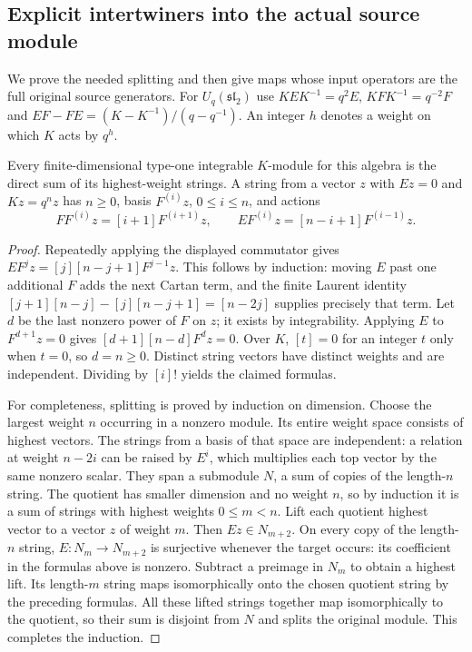 \subsection{Explicit intertwiners into the actual source module}

We prove the needed splitting and then give maps whose input
operators are the full original source generators. For
$U_q(\mathfrak{sl}_2)$ use
$KEK^{-1}=q^2E$, $KFK^{-1}=q^{-2}F$ and
$EF-FE=(K-K^{-1})/(q-q^{-1})$.
An integer $h$ denotes a weight on which $K$ acts by $q^h$.

\begin{lemma}\label{lem:gct-explicit-string-splitting}
Every finite-dimensional type-one integrable $K$-module for this
algebra is the direct sum of its highest-weight strings. A string
from a vector $z$ with $Ez=0$ and $Kz=q^n z$ has $n\geq0$,
basis $F^{(i)}z$, $0\leq i\leq n$, and actions
\[
 F F^{(i)}z=[i+1]F^{(i+1)}z,\qquad
 E F^{(i)}z=[n-i+1]F^{(i-1)}z.
\]
\end{lemma}
\begin{proof}
Repeatedly applying the displayed commutator gives
$EF^jz=[j][n-j+1]F^{j-1}z$. This follows by induction:
moving $E$ past one additional $F$ adds the next Cartan term,
and the finite Laurent identity
$[j+1][n-j]-[j][n-j+1]=[n-2j]$ supplies precisely that term.
Let $d$ be the last nonzero power of $F$ on $z$; it exists by
integrability. Applying $E$ to $F^{d+1}z=0$ gives
$[d+1][n-d]F^dz=0$. Over $K$, $[t]=0$ for an integer $t$
only when $t=0$, so $d=n\geq0$. Distinct string vectors have
distinct weights and are independent. Dividing by $[i]!$ yields
the claimed formulas.

For completeness, splitting is proved by induction on dimension.
Choose the largest weight $n$ occurring in a nonzero module.
Its entire weight space consists of highest vectors. The strings
from a basis of that space are independent: a relation at weight
$n-2i$ can be raised by $E^i$, which multiplies each top vector
by the same nonzero scalar. They span a submodule $N$, a sum
of copies of the length-$n$ string. The quotient has smaller
dimension and no weight $n$, so by induction it is a sum of
strings with highest weights $0\leq m<n$.
Lift each quotient highest vector to a vector $z$ of weight $m$.
Then $Ez\in N_{m+2}$. On every copy of the length-$n$ string,
$E:N_m\to N_{m+2}$ is surjective whenever the target occurs:
its coefficient in the formulas above is nonzero. Subtract a
preimage in $N_m$ to obtain a highest lift. Its length-$m$
string maps isomorphically onto the chosen quotient string by
the preceding formulas. All these lifted strings together map
isomorphically to the quotient, so their sum is disjoint from
$N$ and splits the original module. This completes the induction.
\end{proof}

